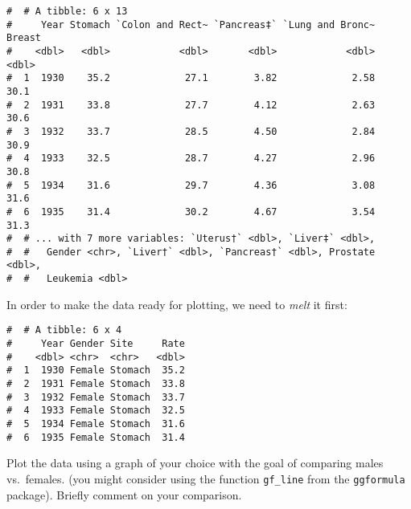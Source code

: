 \documentclass[letterpaper,9pt,twoside,printwatermark=false]{pinp}
\begin{document}
\begin{ShadedResult}
\begin{verbatim}
#  # A tibble: 6 x 13
#     Year Stomach `Colon and Rect~ `Pancreas‡` `Lung and Bronc~ Breast
#    <dbl>   <dbl>            <dbl>       <dbl>            <dbl>  <dbl>
#  1  1930    35.2             27.1        3.82             2.58   30.1
#  2  1931    33.8             27.7        4.12             2.63   30.6
#  3  1932    33.7             28.5        4.50             2.84   30.9
#  4  1933    32.5             28.7        4.27             2.96   30.8
#  5  1934    31.6             29.7        4.36             3.08   31.6
#  6  1935    31.4             30.2        4.67             3.54   31.3
#  # ... with 7 more variables: `Uterus†` <dbl>, `Liver‡` <dbl>,
#  #   Gender <chr>, `Liver†` <dbl>, `Pancreas†` <dbl>, Prostate <dbl>,
#  #   Leukemia <dbl>
\end{verbatim}
\end{ShadedResult}

In order to make the data ready for plotting, we need to \emph{melt} it
first:

\begin{Shaded}
\begin{Highlighting}[]
\StringTok{ }\OperatorTok{::} \NormalTok{, } \NormalTok{, }\OperatorTok{-}\OperatorTok{-}
\end{Highlighting}
\end{Shaded}

\begin{ShadedResult}
\begin{verbatim}
#  # A tibble: 6 x 4
#     Year Gender Site     Rate
#    <dbl> <chr>  <chr>   <dbl>
#  1  1930 Female Stomach  35.2
#  2  1931 Female Stomach  33.8
#  3  1932 Female Stomach  33.7
#  4  1933 Female Stomach  32.5
#  5  1934 Female Stomach  31.6
#  6  1935 Female Stomach  31.4
\end{verbatim}
\end{ShadedResult}

Plot the data using a graph of your choice with the goal of comparing
males vs.~females. (you might consider using the function
\texttt{gf\_line} from the \texttt{ggformula} package). Briefly comment
on your comparison.





\end{document}
